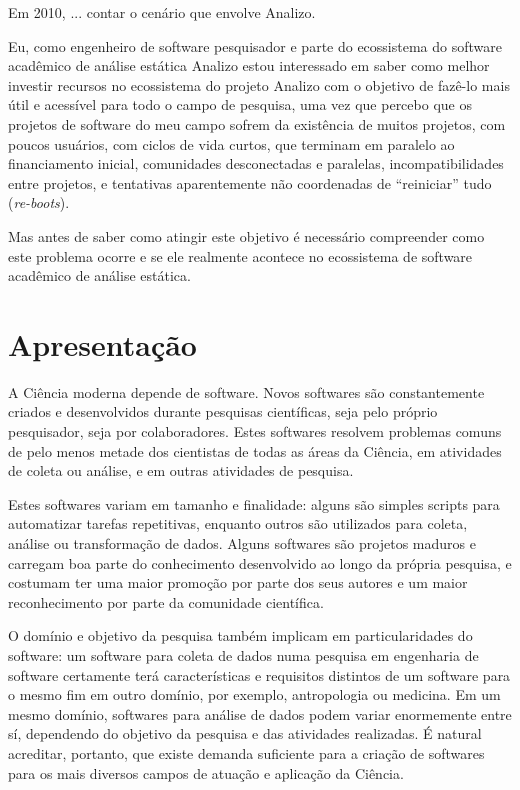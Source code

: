 Em 2010, ... contar o cenário que envolve Analizo.

Eu, como engenheiro de software pesquisador e parte do ecossistema do software
acadêmico de análise estática Analizo estou interessado em saber como melhor
investir recursos no ecossistema do projeto Analizo com o objetivo de fazê-lo
mais útil e acessível para todo o campo de pesquisa, uma vez que percebo que os
projetos de software do meu campo sofrem da existência de muitos projetos, com
poucos usuários, com ciclos de vida curtos, que terminam em paralelo ao
financiamento inicial, comunidades desconectadas e paralelas,
incompatibilidades entre projetos, e tentativas aparentemente não coordenadas
de ``reiniciar'' tudo ({\it re-boots}).

Mas antes de saber como atingir este objetivo é necessário compreender como
este problema ocorre e se ele realmente acontece no ecossistema de software
acadêmico de análise estática.



\section{Apresentação}

A Ciência moderna depende de software. Novos softwares são constantemente
criados e desenvolvidos durante pesquisas científicas, seja pelo próprio pesquisador,
seja por colaboradores. 
Estes softwares resolvem problemas comuns de pelo menos metade dos cientistas 
de todas as áreas da Ciência, em atividades de coleta ou análise, 
e em outras atividades de pesquisa.

Estes softwares variam em tamanho e finalidade: alguns são simples
scripts para automatizar tarefas repetitivas, enquanto outros são utilizados para
coleta, análise ou transformação de dados. Alguns softwares são projetos maduros e
carregam boa parte do conhecimento desenvolvido ao longo da própria pesquisa, e
costumam ter uma maior promoção por parte dos seus autores e um maior
reconhecimento por parte da comunidade científica.

O domínio e objetivo da pesquisa também implicam em particularidades do software: 
um software para coleta de dados numa pesquisa em engenharia de
software certamente terá características e requisitos distintos de um software
para o mesmo fim em outro domínio, por exemplo,  antropologia ou medicina.
Em um mesmo domínio, softwares para análise de dados podem variar
enormemente entre sí, dependendo do objetivo da pesquisa e das atividades realizadas.
\'{E} natural acreditar, portanto, que existe demanda suficiente para a
criação de softwares para os mais diversos campos de atuação e aplicação da
Ciência.

